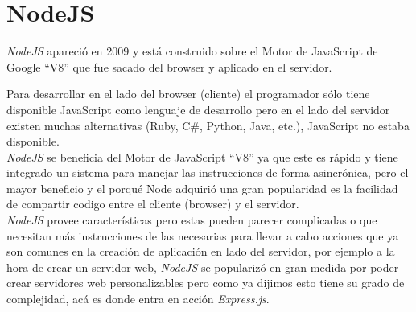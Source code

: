 \section{NodeJS}
\label{sec:node_js}
  \emph{NodeJS} apareció en 2009 y está construido sobre el Motor de JavaScript de Google ``V8'' que fue sacado del browser y aplicado en el servidor.

  Para desarrollar en el lado del browser (cliente) el programador sólo tiene disponible JavaScript como lenguaje de desarrollo pero en el lado del servidor existen muchas alternativas (Ruby, C\#, Python, Java, etc.), JavaScript no estaba disponible.\\

  \emph{NodeJS} se beneficia del Motor de JavaScript ``V8'' ya que este es rápido y tiene integrado un sistema para manejar las instrucciones de forma asincrónica, pero el mayor beneficio y el porqué Node adquirió una gran popularidad es la facilidad de compartir codigo entre el cliente (browser) y el servidor.\\

  \emph{NodeJS} provee características pero estas pueden parecer complicadas o que necesitan más instrucciones de las necesarias para llevar a cabo acciones que ya son comunes en la creación de aplicación en lado del servidor, por ejemplo a la hora de crear un servidor web, \emph{NodeJS} se popularizó en gran medida por poder crear servidores web personalizables pero como ya dijimos esto tiene su grado de complejidad, acá es donde entra en acción \emph{Express.js}.

